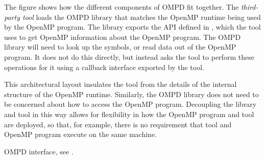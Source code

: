 The figure shows how the different components of OMPD fit together. The \emph{third-party tool} loads
the OMPD library
that matches the OpenMP runtime being used by the OpenMP program. The
library exports the API defined in
, which the tool uses to get
OpenMP information about the
OpenMP program. The OMPD
library will need to look up the symbols, or read data out of the
OpenMP program. It does not do this directly,
but instead asks the tool to perform these operations
for it using a callback interface exported
by the tool.

This architectural layout insulates the tool from the details of the
internal structure of the
OpenMP runtime. Similarly, the OMPD library does not need to be
concerned about how to access
the OpenMP program. Decoupling the library and tool in this
way allows for flexibility in how the OpenMP program and tool are deployed, so that, for example,
there is no requirement that tool and OpenMP program
execute on the same machine.

\begin{crossrefs}
\item OMPD interface, see .
\end{crossrefs}

